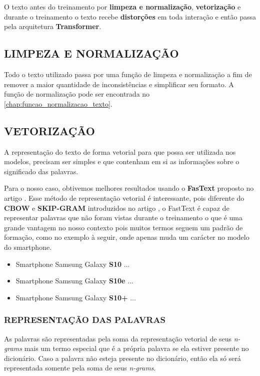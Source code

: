 O texto antes do treinamento por \textbf{limpeza e normalização}, \textbf{vetorização} e durante o treinamento o texto recebe \textbf{distorções} em toda interação e então passa pela arquitetura \textbf{Transformer}.

\subsection{LIMPEZA E NORMALIZAÇÃO}

Todo o texto utilizado passa por uma função de limpeza e normalização a fim de remover a maior quantidade de inconsistências e simplificar seu formato. A função de normalização pode ser encontrada no \autoref{chap:funcao_normalizacao_texto}.

\subsection{VETORIZAÇÃO}

A representação do texto de forma vetorial para que possa ser utilizada nos modelos, precisam ser simples e que contenham em si as informações sobre o significado das palavras.

Para o nosso caso, obtivemos melhores resultados usando o \textbf{FasText} proposto no artigo \cite{fasttext}. Esse método de representação vetorial é interessante, pois diferente do \textbf{CBOW} e \textbf{SKIP-GRAM} introduzidos no artigo \cite{mikolov}, o FastText é capaz de representar palavras que não foram vistas durante o treinamento o que é uma grande vantagem no nosso contexto pois muitos termos seguem um padrão de formação, como no exemplo à seguir, onde apenas muda um carácter no modelo do smartphone.

\begin{itemize}
\item Smartphone Samsung Galaxy \textbf{S10} ...
\item Smartphone Samsung Galaxy \textbf{S10e} ...
\item Smartphone Samsung Galaxy \textbf{S10+} ...
\end{itemize}

\subsubsection{REPRESENTAÇÃO DAS PALAVRAS}

As palavras são representadas pela soma da representação vetorial de seus \textit{n-grams} mais um termo especial que é a própria palavra se ela estiver presente no dicionário. Caso a palavra não esteja presente no dicionário, então ela só será representada somente pela soma de seus \textit{n-grams}.

